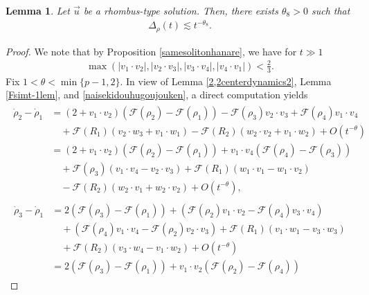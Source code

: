 \documentclass[reqno]{amsart}
\theoremstyle{plain}
\newtheorem{lemma}[theorem]{Lemma}
\theoremstyle{definition}
\numberwithin{equation}{section}
\begin{document}
\begin{lemma}\label{henchourhomblem}
Let $\vec{u}$ be a rhombus-type solution. Then, there exists $\theta_8>0$ such that 
\begin{align}\label{deltarhoes}
\Delta_{\rho}(t)\lesssim t^{-\theta_8}.
\end{align}
\end{lemma}
\begin{proof}
We note that by Proposition \ref{samesolitonhanare}, we have for $t\gg 1$
\begin{align}\label{naisekidouhugoujouken}
\max{(|v_1\cdot v_2|,|v_2\cdot v_3|, |v_3\cdot v_4|, |v_4\cdot v_1|)}<\frac{2}{3}.
\end{align}
Fix $1<\theta<\min\{p-1,2\}$. In view of  Lemma \ref{2,2centerdynamics2}, Lemma \ref{Fsimt-1lem}, and
\eqref{naisekidouhugoujouken}, a direct computation yields
\begin{align}\label{rho2-rho1es1}
\begin{aligned}
\dot{\rho}_2-\dot{\rho}_1&=\left(2+v_1\cdot v_2\right)\left(\mathcal{F}(\rho_2)-\mathcal{F}(\rho_1)\right)-\mathcal{F}(\rho_3)v_2\cdot v_3+\mathcal{F}(\rho_4)v_1\cdot v_4
\\
&\quad+\mathcal{F}(R_1)\left(v_2\cdot w_3+v_1\cdot w_1\right)-\mathcal{F}(R_2)\left(w_2\cdot v_2+v_1\cdot w_2\right)+O\left(t^{-\theta}\right)
\\
&=\left(2+v_1\cdot v_2\right)\left(\mathcal{F}(\rho_2)-\mathcal{F}(\rho_1)\right)+v_1\cdot v_4\left(\mathcal{F}(\rho_4)-\mathcal{F}(\rho_3)\right)
\\
&\quad+\mathcal{F}(\rho_3)(v_1\cdot v_4-v_2\cdot v_3)+\mathcal{F}(R_1)\left(w_1\cdot v_1-w_1\cdot v_2\right)
\\
&\quad -\mathcal{F}(R_2)\left(w_2\cdot v_1+w_2\cdot v_2\right)+O\left(t^{-\theta}\right),
\end{aligned}
\end{align}
\begin{align}\label{rho3-rho1es1}
\begin{aligned}
\dot{\rho}_3-\dot{\rho}_1&=2\left(\mathcal{F}(\rho_3)-\mathcal{F}(\rho_1)\right)+\left(\mathcal{F}(\rho_2)v_1\cdot v_2-\mathcal{F}(\rho_4)v_3\cdot v_4\right)
\\
&\quad+\left(\mathcal{F}(\rho_4)v_1\cdot v_4-\mathcal{F}(\rho_2)v_2\cdot v_3\right)+\mathcal{F}(R_1)\left(v_1\cdot w_1-v_3\cdot w_3\right)
\\
&\quad +\mathcal{F}(R_2)\left(v_3\cdot w_4-v_1\cdot w_2\right)+O\left(t^{-\theta}\right)
\\
&=2\left(\mathcal{F}(\rho_3)-\mathcal{F}(\rho_1)\right)+v_1\cdot v_2\left(\mathcal{F}(\rho_2)-\mathcal{F}(\rho_4)\right)

\end{aligned}
\end{align}
\end{proof}
\end{document}
